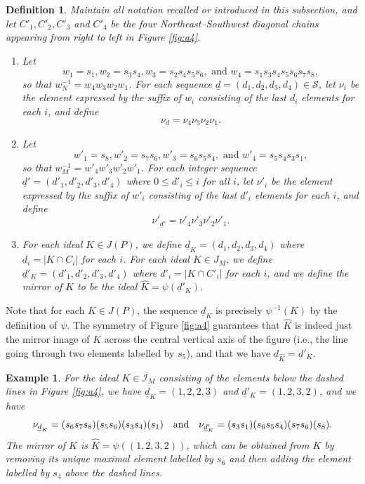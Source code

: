 \documentclass[10pt,a4paper]{amsart}
\newtheorem{defn}[theorem]{Definition}
\newtheorem{exa}[theorem]{Example}
\numberwithin{equation}{section}
\newcommand{\wnn}{w_{N}}
\newcommand{\seqd}{\underline{d}}
\newcommand{\cali}{\mathcal{I}}
\newcommand{\cals}{\mathcal{S}}
\newcommand{\inverse}{^{-1}}
\newcommand{\abs}[1]{\lvert #1 \rvert}
\begin{document}
\begin{defn}
\label{defn:seq_to_word}
Maintain all notation recalled or introduced in this subsection, and let $C'_1,
C'_2, C'_3$ and $C'_4$ be the four Northeast--Southwest diagonal
  chains appearing from right to left in Figure \ref{fig:a4}.
\begin{enumerate}
\item 
Let 
\[
  w_1=s_1, w_2=s_3s_4,
w_3=s_2s_4s_5s_6, \text{ and }w_4=s_1s_3s_4s_5s_6s_7s_8,\]
so that $\wnn\inverse=w_4w_3w_2w_1$.
For each sequence $\seqd=(d_1,d_2,d_3,d_4)\in \cals$,
let $\nu_i$ be the element
expressed by the suffix of $w_i$ consisting of the last $d_i$ elements for each
$i$, and
define
\[
  \nu_{\seqd}=\nu_4\nu_3\nu_2\nu_1.
\]
\item Let 
  \[
  w'_1=s_8, w'_2=s_7s_6, w'_3=s_6s_5s_4, \text{ and } w'_4=s_5s_4s_3s_1,
  \]
  so that $w_M\inverse = w'_4w'_3w'_2w'_1$.  
For each integer sequence $\seqd'=(d'_1,d'_2,d'_3,d'_4)$ where $0\le d'_i\le i$ for all
$i$, let $\nu'_i$ be the 
element expressed by the suffix of $w'_i$ consisting of the last $d'_i$ elements for
each $i$, and
define
\[
  \nu'_{\seqd'}=\nu'_4\nu'_3\nu'_2\nu'_1.
\]
\item For each ideal $K\in J(P)$, we define $\seqd_K=(d_1,d_2,d_3,d_4)$ where
  $d_i=\abs{K\cap C_i}$ for each $i$. For each ideal $K\in J_M$, we define
  $\seqd'_K=(d'_1,d'_2,d'_3, d'_4)$ where $d'_i=\abs{K\cap C'_i}$ for each $i$,
  and we define the \emph{mirror} of $K$ to be the ideal $\hat K=\psi(\seqd'_K)$.
\end{enumerate} \end{defn}

Note that for each $K\in J(P)$, the sequence $\seqd_K$ is precisely
$\psi\inverse(K)$ by the definition of $\psi$. The symmetry of Figure
\ref{fig:a4} guarantees that $\hat K$ is indeed just the mirror image of $K$
across the central vertical axis of the figure (i.e., the line going through two
elements labelled by $s_5$), and that we have $\seqd_{\hat K}=\seqd'_K$. 

\begin{exa}
\label{exa:dd'}
For the ideal $K\in \cali_M$ consisting of the elements below the dashed lines in
Figure \ref{fig:a4}, we have $\seqd_K=(1,2,2,3)$ and $\seqd'_K=(1,2,3,2)$, and we have
\[
  \nu_{\seqd_K}=(s_6s_7s_8)(s_5s_6)(s_3s_4)(s_1)\text{\quad and\quad}
  \nu_{\seqd'_K}=(s_3s_1)(s_6s_5s_4)(s_7s_6)(s_8).
\]
The mirror
of $K$ is $\hat K=\psi((1,2,3,2))$, which can be obtained from $K$ by removing
its unique maximal element labelled by $s_6$ and then adding the element
labelled by $s_4$ above the dashed lines.
\end{exa}
\end{document}
